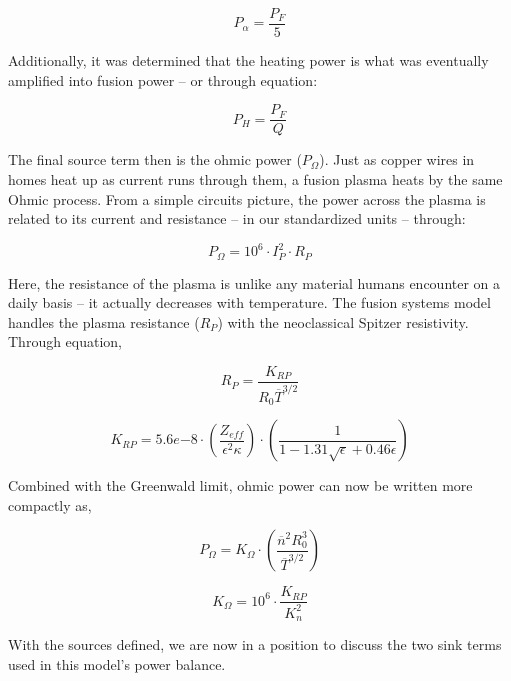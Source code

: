 \begin{equation}
	\label{eq:palpha}
	P_\alpha = \frac{P_F}{5}
\end{equation}

Additionally, it was determined that the heating power is what was eventually amplified into fusion power -- or through equation:

\begin{equation}
	\label{eq:ph}
	P_H = \frac{P_F}{Q}
\end{equation}

The final source term then is the ohmic power ($P_\Omega$). Just as copper wires in homes heat up as current runs through them, a fusion plasma heats by the same Ohmic process. From a simple circuits picture, the power across the plasma is related to its current and resistance -- in our standardized units -- through:

\begin{equation}
	\label{eq:pohmic_basic}
	P_\Omega = 10^6 \cdot I_P^2 \cdot R_P
\end{equation}

Here, the resistance of the plasma is unlike any material humans encounter on a daily basis -- it actually decreases with temperature. The fusion systems model handles the plasma resistance ($R_P$)  with the neoclassical Spitzer resistivity. Through equation,

\begin{equation}
	\label{eq:rp}
	R_P = \frac{K_{RP}}{R_0 \overline T ^ {3/2}}
\end{equation}

\begin{equation}
	K_{RP} = 5.6e{-8} \cdot \left( \frac{ Z_{eff} }{ \epsilon^2 \kappa } \right) \cdot \left( \frac{1}{ 1 - 1.31 \sqrt{ \epsilon } + 0.46 \epsilon } \right)
\end{equation}

Combined with the Greenwald limit, ohmic power can now be written more compactly as,

\begin{equation}
	\label{eq:pohmic}
	P_\Omega = K_\Omega \cdot \left( \frac{ \overline n ^ 2 R_0^3 }{\overline T ^ {3/2}} \right)
\end{equation}

\begin{equation}
	K_\Omega = 10^6 \cdot \frac{K_{RP}}{K_n^2}
\end{equation}

With the sources defined, we are now in a position to discuss the two sink terms used in this model's power balance.

